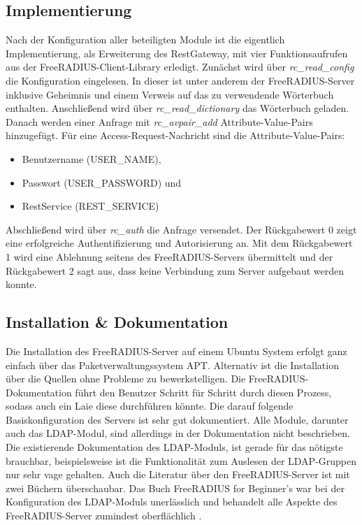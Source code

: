 \documentclass[11pt,a4paper]{report}
\begin{document}
\subsection{Implementierung}

Nach der Konfiguration aller beteiligten Module ist die eigentlich Implementierung, als Erweiterung des RestGateway, mit vier Funktionsaufrufen aus der FreeRADIUS-Client-Library erledigt. Zunächst wird über \textit{rc\_read\_config} die Konfiguration eingelesen. In dieser ist unter anderem der FreeRADIUS-Server inklusive Geheimnis und einem Verweis auf das zu verwendende Wörterbuch enthalten. Anschließend wird über \textit{rc\_read\_dictionary} das Wörterbuch geladen. Danach werden einer Anfrage mit \textit{rc\_avpair\_add} Attribute-Value-Pairs hinzugefügt. Für eine Access-Request-Nachricht sind die Attribute-Value-Pairs:

\begin{itemize}
\item Benutzername (USER\_NAME),
\item Passwort (USER\_PASSWORD) und
\item RestService (REST\_SERVICE)
\end{itemize}

Abschließend wird über \textit{rc\_auth} die Anfrage versendet. Der Rückgabewert 0 zeigt eine erfolgreiche Authentifizierung und Autorisierung an. Mit dem Rückgabewert 1 wird eine Ablehnung seitens des FreeRADIUS-Servers übermittelt und der Rückgabewert 2 sagt aus, dass keine Verbindung zum Server aufgebaut werden konnte.

\subsection{Installation \& Dokumentation}

Die Installation des FreeRADIUS-Server auf einem Ubuntu System erfolgt ganz einfach über das Paketverwaltungssystem APT. Alternativ ist die Installation über die Quellen ohne Probleme zu bewerkstelligen. Die FreeRADIUS-Dokumentation führt den Benutzer Schritt für Schritt durch diesen Prozess, sodass auch ein Laie diese durchführen könnte. Die darauf folgende Basiskonfiguration des Servers ist sehr gut dokumentiert. Alle Module, darunter auch das LDAP-Modul, sind allerdings in der Dokumentation nicht beschrieben. Die existierende Dokumentation des LDAP-Moduls, ist gerade für das nötigste brauchbar, beispielsweise ist die Funktionalität zum Auslesen der LDAP-Gruppen nur sehr vage gehalten. Auch die Literatur über den FreeRADIUS-Server ist mit zwei Büchern  überschaubar. Das Buch FreeRADIUS for Beginner's war bei der Konfiguration des LDAP-Moduls unerlässlich und behandelt alle Aspekte des FreeRADIUS-Server zumindest oberflächlich \cite{walt}. 
\end{document}

